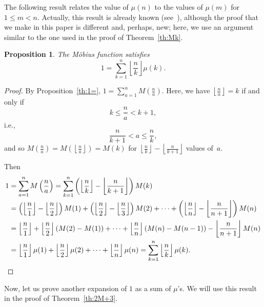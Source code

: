 \documentclass[10pt]{amsart}
\newtheorem{propo}[theor]{Proposition}
\begin{document}
The following result relates the value of $\mu(n)$ to
the values of $\mu(m)$ for $1\leq m<n$. Actually, this result is
already known (see~\cite[Theorem~3.12]{Ap}),
although the proof that we make in this paper is different and,
perhaps, new; here, we use an argument similar to the one used in the proof
of Theorem~\ref{th:Mk}.

\begin{propo}
\label{th:1=k}
The M\"obius function satisfies
\begin{equation}
\label{eq:1=k}
1 = \sum_{k=1}^n \left\lfloor \frac {n}{k}\right\rfloor \mu(k).
\end{equation}
\end{propo}

\begin{proof}
By Proposition~\ref{th:1=}, $1 = \sum_{a=1}^n M\left(\frac na\right)$.
Here, we have $\left\lfloor \frac {n}{a}\right\rfloor =k$ if and only if
$$
k\leq \frac na < k+1,
$$
i.e.,
$$
\frac n{k+1} < a \leq \frac nk,
$$
and so $M\left(\frac na\right) = M\left(\left\lfloor\frac n a\right\rfloor\right) = M(k)$
for $\left\lfloor\frac n{k}\right\rfloor -\left\lfloor\frac n{k+1}\right\rfloor$
values of~$a$.

Then
\begin{align*}
1 &= \sum_{a=1}^n M\left(\frac na\right)
= \sum_{k=1}^n \left( \left\lfloor\frac n{k}\right\rfloor
- \left\lfloor\frac n{k+1}\right\rfloor\right) M(k)
\\
&= \left( \left\lfloor\frac n{1}\right\rfloor -\left\lfloor\frac n{2}\right\rfloor\right) M(1)
+ \left( \left\lfloor\frac n{2}\right\rfloor -\left\lfloor\frac n{3}\right\rfloor\right) M(2)
+ \cdots
+ \left( \left\lfloor\frac n{n}\right\rfloor -\left\lfloor\frac n{n+1}\right\rfloor\right) M(n)
\\
&= \left\lfloor\frac n{1}\right\rfloor
+ \left\lfloor\frac n{2}\right\rfloor (M(2)-M(1))
+ \cdots
+ \left\lfloor\frac n{n}\right\rfloor (M(n)-M(n-1))
- \left\lfloor\frac n{n+1}\right\rfloor M(n)
\\
&= \left\lfloor\frac n{1}\right\rfloor \mu(1)
+ \left\lfloor\frac n{2}\right\rfloor \mu(2)
+ \cdots
+ \left\lfloor\frac n{n}\right\rfloor \mu(n)
= \sum_{k=1}^n \left\lfloor \frac {n}{k}\right\rfloor \mu(k).
\qedhere
\end{align*}
\end{proof}

Now, let us prove another expansion of $1$ as a sum of $\mu$'s.
We will use this result in the proof of Theorem~\ref{th:2M+3}.
\end{document}
